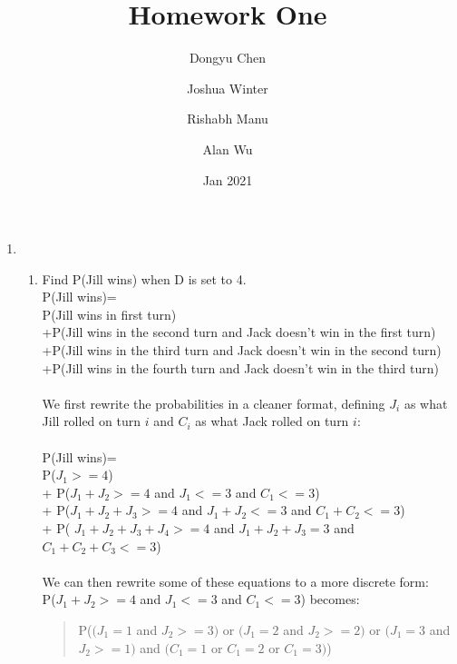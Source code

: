 \documentclass{article}
\title{Homework One}
\author{
    Dongyu Chen\\
    \and
    Joshua Winter\\
    \and 
    Rishabh Manu\\
    \and
    Alan Wu\\
    }
\date{Jan 2021}
\begin{document}
\maketitle

\begin{enumerate}
\\Mailing tubes will be cited based on their reference number from the textbook. For example, if we used disjoint OR, the corresponding mailing tube would be (2.2) in the textbook (pg. 9)
\\
    \item 
        \begin{enumerate}
            \item Find P(Jill wins) when D is set to 4. 
            \\P(Jill wins)=
            \\P(Jill wins in first turn)
            \\+P(Jill wins in the second turn and Jack doesn't win in the first turn)
            \\+P(Jill wins in the third turn and Jack doesn't win in the second turn)
            \\+P(Jill wins in the fourth turn and Jack doesn't win in the third turn)\\
            \\
            We first rewrite the probabilities in a cleaner format, defining $J_i$ as what Jill rolled on turn $i$ and $C_i$ as what Jack rolled on turn $i$:
            \\
            \\P(Jill wins)= 
            \\P($J_1 >= 4$)
            \\+ P($J_1 + J_2 >= 4$ and $J_1 <= 3$ and $C_1 <= 3$)
            \\+ P($J_1 + J_2 + J_3 >= 4$ and $J_1 + J_2 <= 3$ and $C_1 + C_2 <= 3$)
            \\+ P( $J_1 + J_2 + J_3 + J_4 >= 4$ and $J_1 + J_2 + J_3 = 3$ and $C_1 + C_2 + C_3 <= 3$)\\
            \\
            We can then rewrite some of these equations to a more discrete form: 
            \\P($J_1 + J_2 >= 4$ and $J_1 <= 3$ and $C_1 <= 3$) becomes:
            \begin{quote}
            P($(J_1 = 1$ and $J_2 >= 3)$ or $(J_1 = 2$ and $J_2 >= 2)$ or $(J_1 = 3$ and $J_2 >= 1) $ and $(C_1 = 1$ or $C_1 = 2$ or $C_1 = 3)$)

\end{quote}
\end{enumerate}
\end{enumerate}
\end{document}
